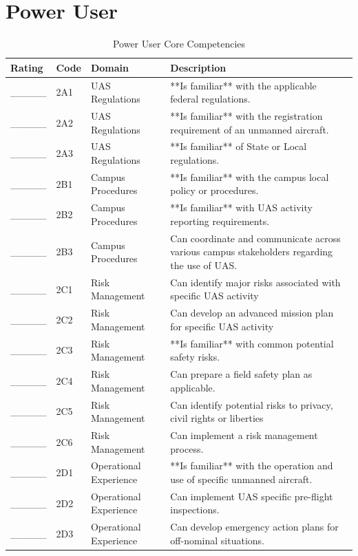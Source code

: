 \documentclass[
]{book}
\begin{document}
\hypertarget{power-user}{%
\section{Power User}\label{power-user}}

\begin{longtable}[t]{lll>{\raggedright\arraybackslash}p{25em}}
\caption{\label{tab:unnamed-chunk-8}Power User Core Competencies}\\
\toprule
Rating & Code & Domain & Description\\
\midrule
\_\_\_\_\_ & 2A1 & UAS Regulations & **Is familiar** with the applicable federal regulations.\\
\_\_\_\_\_ & 2A2 & UAS Regulations & **Is familiar** with the registration requirement of an unmanned aircraft.\\
\_\_\_\_\_ & 2A3 & UAS Regulations & **Is familiar** of State or Local regulations.\\
\_\_\_\_\_ & 2B1 & Campus Procedures & **Is familiar** with the campus local policy or procedures.\\
\_\_\_\_\_ & 2B2 & Campus Procedures & **Is familiar** with UAS activity reporting requirements.\\
\addlinespace
\_\_\_\_\_ & 2B3 & Campus Procedures & Can coordinate and communicate across various campus stakeholders regarding the use of UAS.\\
\_\_\_\_\_ & 2C1 & Risk Management & Can identify major risks associated with specific UAS activity\\
\_\_\_\_\_ & 2C2 & Risk Management & Can develop an advanced mission plan for specific UAS activity\\
\_\_\_\_\_ & 2C3 & Risk Management & **Is familiar** with common potential safety risks.\\
\_\_\_\_\_ & 2C4 & Risk Management & Can prepare a field safety plan as applicable.\\
\addlinespace
\_\_\_\_\_ & 2C5 & Risk Management & Can identify potential risks to privacy, civil rights or liberties\\
\_\_\_\_\_ & 2C6 & Risk Management & Can implement a risk management process.\\
\_\_\_\_\_ & 2D1 & Operational Experience & **Is familiar** with the operation and use of specific unmanned aircraft.\\
\_\_\_\_\_ & 2D2 & Operational Experience & Can implement UAS specific pre-flight inspections.\\
\_\_\_\_\_ & 2D3 & Operational Experience & Can develop emergency action plans for off-nominal situations.\\
\bottomrule
\end{longtable}
\end{document}
